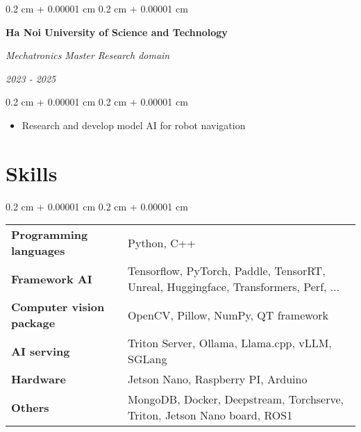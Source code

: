 \documentclass[10pt, letterpaper]{article}
\newenvironment{highlights}{
    \begin{itemize}[
        topsep=0.10 cm,
        parsep=0.10 cm,
        partopsep=0pt,
        itemsep=0pt,
        leftmargin=0.4 cm + 10pt
    ]
}{
    \end{itemize}
} %
\newenvironment{onecolentry}{
    \begin{adjustwidth}{
        0.2 cm + 0.00001 cm
    }{
        0.2 cm + 0.00001 cm
    }
}{
    \end{adjustwidth}
} %
\newenvironment{twocolentry}[2][]{
    \onecolentry
    \def\secondColumn{#2}
    \setcolumnwidth{\fill, 4.5 cm}
    \begin{paracol}{2}
}{
    \switchcolumn \raggedleft \secondColumn
    \end{paracol}
    \endonecolentry
} %
\begin{document}
    \vspace{0.2 cm}

    \begin{twocolentry}{
        \textit{2023 - 2025}
    }
        \textbf{Ha Noi University of Science and Technology}
        
        \textit{Mechatronics Master Research domain}
    \end{twocolentry}

    \begin{onecolentry}
        \begin{highlights}
            \item Research and develop model AI for robot navigation
        \end{highlights}
    \end{onecolentry}

    \section{Skills}

    \begin{onecolentry}
        \begin{tabularx}{\textwidth}{lX}
            \textbf{Programming languages} & Python, C++ \\
            \textbf{Framework AI} & Tensorflow, PyTorch, Paddle, TensorRT, Unreal, Huggingface, Transformers, Perf, ... \\
            \textbf{Computer vision package} & OpenCV, Pillow, NumPy, QT framework \\
            \textbf{AI serving} & Triton Server, Ollama, Llama.cpp, vLLM, SGLang \\
            \textbf{Hardware} & Jetson Nano, Raspberry PI, Arduino \\
            \textbf{Others} & MongoDB, Docker, Deepstream, Torchserve, Triton, Jetson Nano board, ROS1 \\
        \end{tabularx}
    \end{onecolentry}
\end{document}
